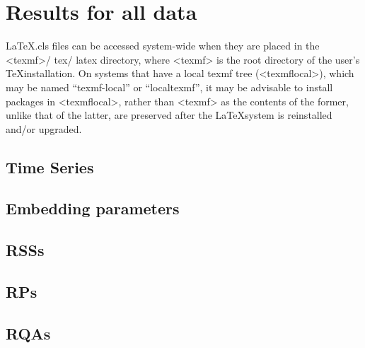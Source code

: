 		\chapter{Results for all data} \label{appendix:d}



\LaTeX .cls  files can be accessed system-wide when they are placed in the
<texmf>/ tex/ latex directory, where <texmf> is the root directory of the user’s
\TeX installation.
On systems that have a local texmf tree (<texmflocal>), which
may be named ``texmf-local'' or ``localtexmf'', it may be advisable to install
packages in <texmflocal>, rather than <texmf> as the contents of the former,
unlike that of the latter, are preserved after the \LaTeX system is reinstalled
and/or upgraded.


\section{Time Series} \label{appendix:d:ts}
\section{Embedding parameters} \label{appendix:d:ep}
\section{RSSs} \label{appendix:d:rsss}
\section{RPs} \label{appendix:d:rps}
\section{RQAs} \label{appendix:d:rpas}



